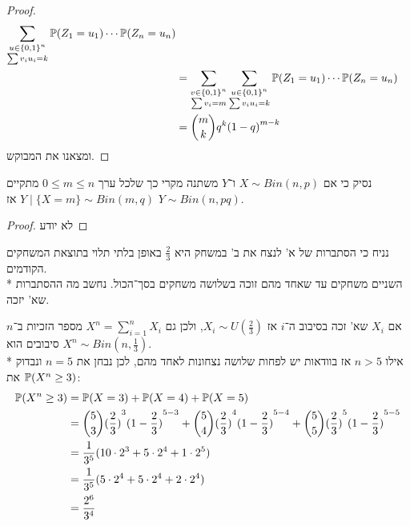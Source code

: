 \begin{proof}
\begin{align*}
		\sum_{\substack{u \in {\{0, 1\}}^n \\ \sum v_i u_i = k}} \mathbb{P}(Z_1 = u_1) \cdots \mathbb{P}(Z_n = u_n) \\
		& = \sum_{\substack{v \in {\{0, 1\}}^n \\ \sum v_i = m}} \sum_{\substack{u \in {\{0, 1\}}^n \\ \sum v_i u_i = k}} \mathbb{P}(Z_1 = u_1) \cdots \mathbb{P}(Z_n = u_n) \\
		& = \binom{m}{k} q^k {(1 - q)}^{m - k}
	\end{align*}
	ומצאנו את המבוקש.
\end{proof}

\subquestion{}
נסיק כי אם $X \sim Bin(n, p)$ ו־$Y$ משתנה מקרי כך שלכל ערך $0 \le m \le n$ מתקיים $Y \mid \{X = m\} \sim Bin(m, q)$ אז $Y \sim Bin(n, pq)$.
\begin{proof}
	לא יודע
\end{proof}

\question{}
נניח כי הסתברות של א' לנצח את ב' במשחק היא $\frac{2}{3}$ באופן בלתי תלוי בתוצאת המשחקים הקודמים. \\*
השניים משחקים עד שאחד מהם זוכה בשלושה משחקים בסך־הכול.
נחשב מה ההסתברות שא' יזכה.
\begin{solution}
	אם $X_i$ שא' זכה בסיבוב ה־$i$ אז $X_i \sim U(\frac{2}{3})$, ולכן גם $X^n = \sum_{i = 1}^n X_i$ מספר הזכיות ב־$n$ סיבובים הוא $X^n \sim Bin(n, \frac{1}{3})$. \\*
	אילו $n > 5$ אז בוודאות יש לפחות שלושה נצחונות לאחד מהם, לכן נבחן את $n = 5$ ונבדוק את $\mathbb{P}(X^n \ge 3)$:
	\begin{align*}
		\mathbb{P}(X^n \ge 3) 
		& = \mathbb{P}(X = 3) + \mathbb{P}(X = 4) + \mathbb{P}(X = 5) \\
		& = \binom{5}{3} {(\frac{2}{3})}^3 {(1 - \frac{2}{3})}^{5 - 3} + \binom{5}{4} {(\frac{2}{3})}^4 {(1 - \frac{2}{3})}^{5 - 4} + \binom{5}{5} {(\frac{2}{3})}^5 {(1 - \frac{2}{3})}^{5 - 5} \\
		& = \frac{1}{3^5} (10 \cdot 2^3 + 5 \cdot 2^4 + 1 \cdot 2^5) \\
		& = \frac{1}{3^5} (5 \cdot 2^4 + 5 \cdot 2^4 + 2 \cdot 2^4) \\
		& = \frac{2^6}{3^4}
	\end{align*}
\end{solution}


